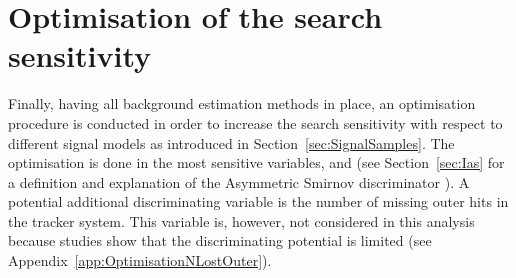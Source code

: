 \FloatBarrier
\chapter{Optimisation of the search sensitivity}
\label{sec:Optimisation}
Finally, having all background estimation methods in place, an optimisation procedure is conducted in order to increase the search sensitivity with respect to different signal models as introduced in Section~\ref{sec:SignalSamples}.
The optimisation is done in the most sensitive variables, \pt and \ias (see Section~\ref{sec:Ias} for a definition and explanation of the Asymmetric Smirnov discriminator \ias).
A potential additional discriminating variable is the number of missing outer hits \nlostouter in the tracker system. 
This variable is, however, not considered in this analysis because studies show that the discriminating potential is limited (see Appendix~\ref{app:OptimisationNLostOuter}).

